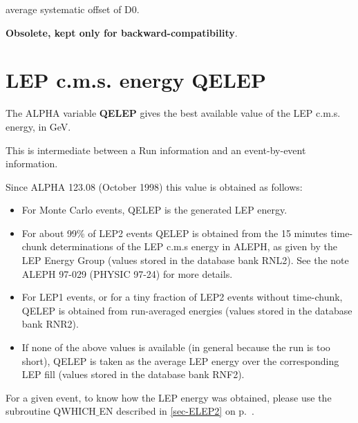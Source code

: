 \begin{indentlist}{ 2.50cm}{ 2.75cm}
average systematic offset of D0.

 {\bf Obsolete, kept only for backward-compatibility}.

\end{indentlist}

\par
\section{\label{sec-CHUNKELEP}LEP c.m.s. energy  QELEP}
\par
The ALPHA variable {\bf QELEP} gives the best available value of the LEP c.m.s. energy, in GeV.

This is intermediate between a Run information and an event-by-event information.

                    Since ALPHA 123.08 (October 1998) this value is obtained as follows:

\begin{itemize}

\item                    For Monte Carlo events, QELEP is the generated LEP energy.

\item                    For about 99\% of LEP2 events
                     QELEP is  obtained from the 15 minutes time-chunk determinations
                    of the LEP c.m.s energy in ALEPH, as given by the LEP Energy Group (values stored in the database bank RNL2).
                    See the note ALEPH 97-029 (PHYSIC 97-24) for more details.

\item                    For LEP1 events, or for a tiny fraction of LEP2 events without time-chunk, QELEP is
                    obtained from run-averaged energies (values stored in the database bank RNR2).

           
\item               If none of the above values is available (in general because the run is too short), QELEP is taken as the
                    average LEP energy over the corresponding LEP fill (values stored in the database bank RNF2).

\end{itemize}

                    For a given event, to know how the LEP energy was obtained, please use the subroutine QWHICH$\_$EN
                    described in \ref{sec-ELEP2} on p.~\pageref{sec-ELEP2}.

